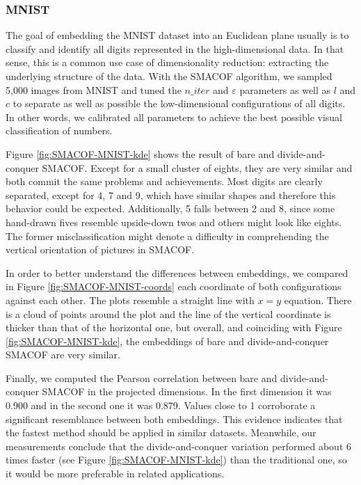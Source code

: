 \subsubsection{MNIST}
\label{sec:dc-SMACOF-MNIST}

The goal of embedding the MNIST dataset into an Euclidean plane usually is to classify and identify all digits represented in the high-dimensional data. In that sense, this is a common use case of dimensionality reduction: extracting the underlying structure of the data. With the SMACOF algorithm, we sampled 5,000 images from MNIST and tuned the $n\_iter$ and $\varepsilon$ parameters as well as $l$ and $c$ to separate as well as possible the low-dimensional configurations of all digits. In other words, we calibrated all parameters to achieve the best possible visual classification of numbers.

Figure \ref{fig:SMACOF-MNIST-kde} shows the result of bare and divide-and-conquer SMACOF. Except for a small cluster of eights, they are very similar and both commit the same problems and achievements. Most digits are clearly separated, except for 4, 7 and 9, which have similar shapes and therefore this behavior could be expected. Additionally, 5 falls between 2 and 8, since some hand-drawn fives resemble upside-down twos and others might look like eights. The former misclassification might denote a difficulty in comprehending the vertical orientation of pictures in SMACOF.

In order to better understand the differences between embeddings, we compared in Figure \ref{fig:SMACOF-MNIST-coords} each coordinate of both configurations against each other. The plots resemble a straight line with $x=y$ equation. There is a cloud of points around the plot and the line of the vertical coordinate is thicker than that of the horizontal one, but overall, and coinciding with Figure \ref{fig:SMACOF-MNIST-kde}, the embeddings of bare and divide-and-conquer SMACOF are very similar.

Finally, we computed the Pearson correlation between bare and divide-and-conquer SMACOF in the projected dimensions. In the first dimension it was 0.900 and in the second one it was 0.879. Values close to 1 corroborate a significant resemblance between both embeddings. This evidence indicates that the fastest method should be applied in similar datasets. Meanwhile, our measurements conclude that the divide-and-conquer variation performed about 6 times faster (see Figure \ref{fig:SMACOF-MNIST-kde}) than the traditional one, so it would be more preferable in related applications.

